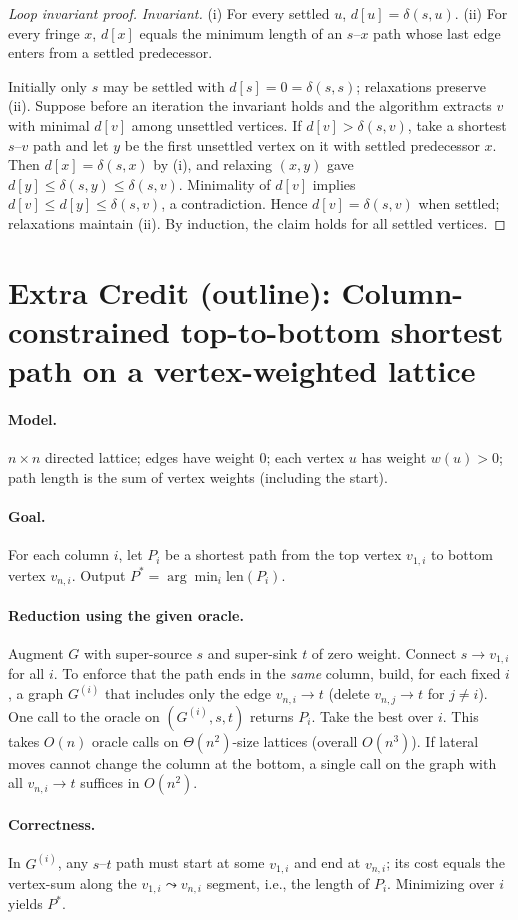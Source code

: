 \documentclass[11pt]{article}
\theoremstyle{definition}
\theoremstyle{remark}
\begin{document}
\begin{proof}[Loop invariant proof]
\emph{Invariant.} (i) For every settled $u$, $d[u]=\delta(s,u)$. (ii) For every fringe $x$, $d[x]$ equals the minimum length of an $s$–$x$ path whose last edge enters from a settled predecessor.

Initially only $s$ may be settled with $d[s]=0=\delta(s,s)$; relaxations preserve (ii). Suppose before an iteration the invariant holds and the algorithm extracts $v$ with minimal $d[v]$ among unsettled vertices. If $d[v]>\delta(s,v)$, take a shortest $s$–$v$ path and let $y$ be the first unsettled vertex on it with settled predecessor $x$. Then $d[x]=\delta(s,x)$ by (i), and relaxing $(x,y)$ gave $d[y]\le \delta(s,y)\le \delta(s,v)$. Minimality of $d[v]$ implies $d[v]\le d[y]\le \delta(s,v)$, a contradiction. Hence $d[v]=\delta(s,v)$ when settled; relaxations maintain (ii). By induction, the claim holds for all settled vertices.
\end{proof}

\bigskip
\section*{Extra Credit (outline): Column-constrained top-to-bottom shortest path on a vertex-weighted lattice}

\paragraph{Model.} $n\times n$ directed lattice; edges have weight $0$; each vertex $u$ has weight $w(u)>0$; path length is the sum of vertex weights (including the start).

\paragraph{Goal.} For each column $i$, let $P_i$ be a shortest path from the top vertex $v_{1,i}$ to bottom vertex $v_{n,i}$. Output $P^\ast=\arg\min_i \mathrm{len}(P_i)$.

\paragraph{Reduction using the given oracle.}
Augment $G$ with super-source $s$ and super-sink $t$ of zero weight. Connect $s\to v_{1,i}$ for all $i$. To enforce that the path ends in the \emph{same} column, build, for each fixed $i$, a graph $G^{(i)}$ that includes only the edge $v_{n,i}\to t$ (delete $v_{n,j}\to t$ for $j\neq i$). One call to the oracle on $(G^{(i)},s,t)$ returns $P_i$. Take the best over $i$. This takes $O(n)$ oracle calls on $\Theta(n^2)$-size lattices (overall $O(n^3)$). If lateral moves cannot change the column at the bottom, a single call on the graph with all $v_{n,i}\to t$ suffices in $O(n^2)$.

\paragraph{Correctness.} In $G^{(i)}$, any $s$–$t$ path must start at some $v_{1,i}$ and end at $v_{n,i}$; its cost equals the vertex-sum along the $v_{1,i}\leadsto v_{n,i}$ segment, i.e., the length of $P_i$. Minimizing over $i$ yields $P^\ast$.
\end{document}
